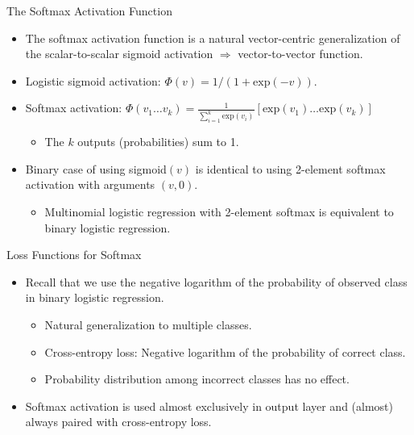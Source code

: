 \begin{frame}{The Softmax Activation Function}
\begin{itemize}
\item The softmax activation function is a natural vector-centric
generalization of the scalar-to-scalar sigmoid activation
$\Rightarrow$ vector-to-vector function.
\item Logistic sigmoid activation: $\Phi(v)= 1/(1+ \mbox{exp}(-v))$.
\item Softmax activation: $\Phi(v_1 \ldots v_k)= \frac{1}{\sum_{i=1}^k \mbox{exp}(v_i)}
\left[ \mbox{exp}(v_1) \ldots \mbox{exp}(v_k) \right]$
\begin{itemize}
\item The  $k$ outputs (probabilities) sum to 1.
\end{itemize}
\item Binary case of using sigmoid$(v)$ is identical to using
2-element  softmax activation with arguments $(v, 0)$.
\begin{itemize}
\item Multinomial logistic regression with 2-element softmax is
equivalent to binary logistic regression.
\end{itemize}
\end{itemize}
\end{frame}


\begin{frame}{Loss Functions for Softmax}
\begin{itemize}
\item Recall that we use the negative logarithm of the probability
of observed class in binary logistic regression.
\begin{itemize}
\item Natural generalization to multiple classes.
\item Cross-entropy loss: Negative logarithm of the probability of
correct class.
\item Probability distribution among incorrect classes has no
effect.
\end{itemize}
\item Softmax activation is used almost exclusively in output layer
and (almost) always  paired with cross-entropy loss.
\end{itemize}
\end{frame}


